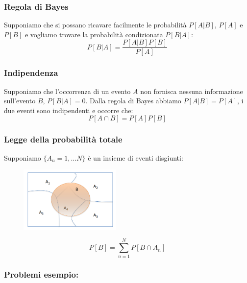         \subsubsection{Regola di Bayes}\label{Regola di Bayes}
            Supponiamo che si possano ricavare facilmente le probabilità $P[A|B]$, $P[A]$ e $P[B]$ e vogliamo trovare la probabilità condizionata $P[B|A]$:
            \[
                P[B|A] = \frac{P[A|B]P[B]}{P[A]}   
            \]
        \subsubsection{Indipendenza}\label{Indipendenza}
            Supponiamo che l'occorrenza  di un evento $A$ non fornisca nessuna informazione sull'evento $B$, $P[B|A] = 0$. Dalla regola di Bayes abbiamo $P[A|B] = P[A]$,
            i due eventi sono indipendenti e occorre che:
            \[
                P[A\cap B] = P[A]P[B]    
            \]
        \subsubsection{Legge della probabilità totale}\label{Legge della probabilità totale}
            Supponiamo $\{ A_n = 1,\dots N\}$ è un insieme di eventi disgiunti:

            \begin{figure}[H]
                \centering
                \includegraphics[width = 5cm]{media/probabilita_totale.png}
            \end{figure}
            \[
                P[B] = \sum_{n=1}^{N}P[B\cap A_n]    
            \]
        \subsubsection{Problemi esempio:}
